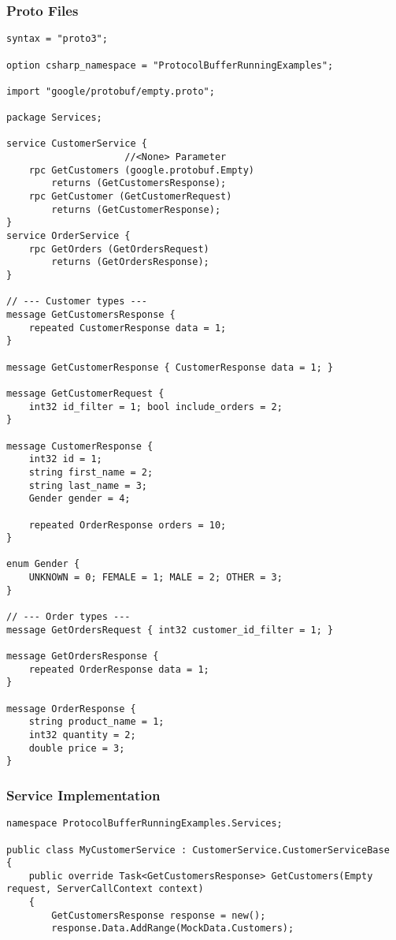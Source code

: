 \begin{multicols*}{2}
\subsubsection{Proto Files}
\begin{lstlisting}
syntax = "proto3";

option csharp_namespace = "ProtocolBufferRunningExamples";

import "google/protobuf/empty.proto";

package Services;

service CustomerService {
                     //<None> Parameter
    rpc GetCustomers (google.protobuf.Empty) 
        returns (GetCustomersResponse);
    rpc GetCustomer (GetCustomerRequest) 
        returns (GetCustomerResponse);
}
service OrderService {
    rpc GetOrders (GetOrdersRequest) 
        returns (GetOrdersResponse);
}

// --- Customer types ---
message GetCustomersResponse {
    repeated CustomerResponse data = 1;
}

message GetCustomerResponse { CustomerResponse data = 1; }

message GetCustomerRequest {
    int32 id_filter = 1; bool include_orders = 2; 
}

message CustomerResponse {
    int32 id = 1;
    string first_name = 2;
    string last_name = 3;
    Gender gender = 4;

    repeated OrderResponse orders = 10;
}

enum Gender {
    UNKNOWN = 0; FEMALE = 1; MALE = 2; OTHER = 3;
}

// --- Order types ---
message GetOrdersRequest { int32 customer_id_filter = 1; }

message GetOrdersResponse {
    repeated OrderResponse data = 1;
}

message OrderResponse {
    string product_name = 1;
    int32 quantity = 2;
    double price = 3;
}
\end{lstlisting}
\subsubsection{Service Implementation}
\begin{lstlisting}
namespace ProtocolBufferRunningExamples.Services;

public class MyCustomerService : CustomerService.CustomerServiceBase
{
    public override Task<GetCustomersResponse> GetCustomers(Empty request, ServerCallContext context)
    {
        GetCustomersResponse response = new();
        response.Data.AddRange(MockData.Customers);


\end{lstlisting}
\end{multicols*}
